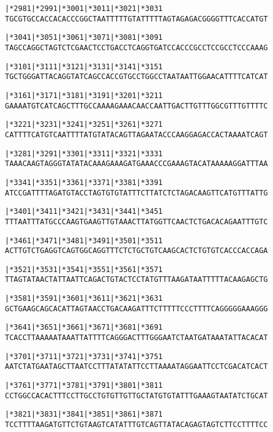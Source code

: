 \documentclass{article}
\begin{document}
\begin{alltt}
   |*2981    |*2991    |*3001    |*3011    |*3021    |*3031 
TGCGTGCCACCACACCCGGCTAATTTTTGTATTTTTAGTAGAGACGGGGTTTCACCATGT

   |*3041    |*3051    |*3061    |*3071    |*3081    |*3091 
TAGCCAGGCTAGTCTCGAACTCCTGACCTCAGGTGATCCACCCGCCTCCGCCTCCCAAAG

   |*3101    |*3111    |*3121    |*3131    |*3141    |*3151 
TGCTGGGATTACAGGTATCAGCCACCGTGCCTGGCCTAATAATTGGAACATTTTCATCAT

   |*3161    |*3171    |*3181    |*3191    |*3201    |*3211 
GAAAATGTCATCAGCTTTGCCAAAAGAAACAACCAATTGACTTGTTTGGCGTTTGTTTTC

   |*3221    |*3231    |*3241    |*3251    |*3261    |*3271 
CATTTTCATGTCAATTTTATGTATACAGTTAGAATACCCAAGGAGACCACTAAAATCAGT

   |*3281    |*3291    |*3301    |*3311    |*3321    |*3331 
TAAACAAGTAGGGTATATACAAAGAAAGATGAAACCCGAAAGTACATAAAAAGGATTTAA

   |*3341    |*3351    |*3361    |*3371    |*3381    |*3391 
ATCCGATTTTAGATGTACCTAGTGTGTATTTCTTATCTCTAGACAAGTTCATGTTTATTG

   |*3401    |*3411    |*3421    |*3431    |*3441    |*3451 
TTTAATTTATGCCCAAGTGAAGTTGTAAACTTATGGTTCAACTCTGACACAGAATTTGTC

   |*3461    |*3471    |*3481    |*3491    |*3501    |*3511 
ACTTGTCTGAGGTCAGTGGCAGGTTTCTCTGCTGTCAAGCACTCTGTGTCACCCACCAGA

   |*3521    |*3531    |*3541    |*3551    |*3561    |*3571 
TTAGTATAACTATTAATTCAGACTGTACTCCTATGTTTAAGATAATTTTTACAAGAGCTG

   |*3581    |*3591    |*3601    |*3611    |*3621    |*3631 
GCTGAAGCAGCACATTAGTAACCTGACAAGATTTCTTTTTCCCTTTTCAGGGGGAAAGGG

   |*3641    |*3651    |*3661    |*3671    |*3681    |*3691 
TCACCTTAAAAATAAATTATTTTCAGGGACTTTGGGAATCTAATGATAAATATTACACAT

   |*3701    |*3711    |*3721    |*3731    |*3741    |*3751 
AATCTATGAATAGCTTAATCCTTTATATATTCCTTAAAATAGGAATTCCTCGACATCACT

   |*3761    |*3771    |*3781    |*3791    |*3801    |*3811 
CCTGGCCACACTTTCCTTGCCTGTGTTGTTGCTATGTGTATTTGAAAGTAATATCTGCAT

   |*3821    |*3831    |*3841    |*3851    |*3861    |*3871 
TCCTTTTAAGATGTTCTGTAAGTCATATTTGTCAGTTATACAGAGTAGTCTTCCTTTTCC

\end{alltt}
\newpage
\end{document}
